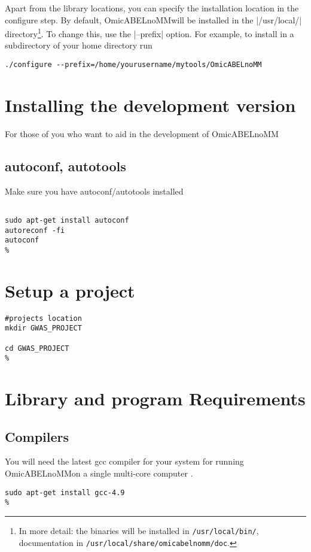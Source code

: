 \documentclass{report}
\newcommand{\oanomm}{OmicABELnoMM}
\begin{document}
Apart from the library locations, you can specify the installation
location in the configure step. By default, \oanomm will be installed
in the |/usr/local/| directory\footnote{In more detail: the binaries
  will be installed in \lstinline{/usr/local/bin/}, documentation in
  \lstinline{/usr/local/share/omicabelnomm/doc}.}. To change this,
use the |--prefix| option. For example, to install in a subdirectory
of your home directory run
\begin{lstlisting}
./configure --prefix=/home/yourusername/mytools/OmicABELnoMM
\end{lstlisting}


\section{Installing the development version}
For those of you who want to aid in the development of \oanomm

\subsection{autoconf, autotools}

Make sure you have autoconf/autotools installed
\begin{lstlisting}[escapechar=\%]

sudo apt-get install autoconf
autoreconf -fi
autoconf
%
\end{lstlisting}


\section{Setup a project}
\begin{lstlisting}[escapechar=\%]
#projects location
mkdir GWAS_PROJECT

cd GWAS_PROJECT
%
\end{lstlisting}

\section{Library and program Requirements}


\subsection{Compilers}

You will need the latest gcc compiler for your system for running \oanomm on a single multi-core computer .

\begin{lstlisting}[escapechar=\%]
sudo apt-get install gcc-4.9
%
\end{lstlisting}
\end{document}
